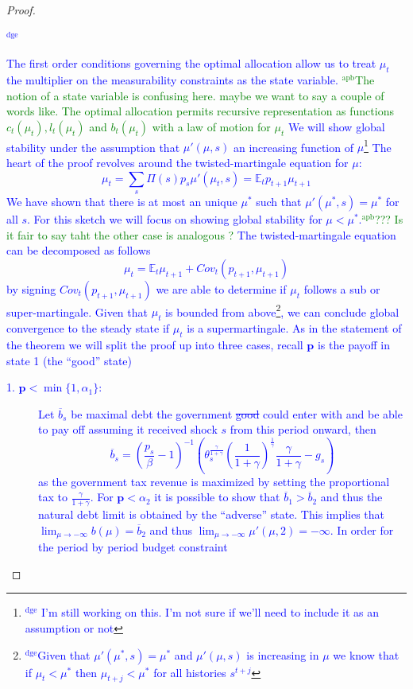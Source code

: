 \documentclass[12pt]{article}
\newcommand{\dge}[1]{\textcolor{blue}{$^{\textrm{dge}}${#1}}}
\newcommand{\apb}[1]{\textcolor{green}{$^{\textrm{apb}}${#1}}}
\newcommand{\EE}{\mathbb E}
\begin{document}
\begin{proof}\dge{The first order conditions governing the optimal allocation allow us to treat $\mu_t$ the multiplier on the measurability constraints as the state variable. 
\apb{The notion of a state variable is confusing here. maybe we want to say a couple of words like. The optimal allocation permits recursive representation as functions $c_t(\mu_t),l_t(\mu_t)$ and $b_t(\mu_t)$ with a law of motion for $\mu_{t}$}
We will show global stability under the assumption that $\mu'(\mu,s)$ an increasing function of $\mu$\footnote{\dge{ I'm still working on this.  I'm not sure if we'll need to include it as an assumption or not}}  The heart of the proof revolves around the twisted-martingale equation for $\mu$:
\[
	\mu_t = \sum_s \Pi(s) p_s \mu'(\mu_t,s) = \EE_t p_{t+1}\mu_{t+1}
\]  We have shown that there is at most an unique $\mu^*$ such that $\mu'(\mu^*,s) = \mu^*$ for all $s$.  For this sketch we will focus on showing global stability for $\mu < \mu^*$.\apb{??? Is it fair to say taht the other case is analogous ?}  The twisted-martingale equation can be decomposed as follows
\[ 
	\mu_t = \EE_t \mu_{t+1}+Cov_t(p_{t+1},\mu_{t+1})
\] by signing $Cov_t(p_{t+1},\mu_{t+1})$ we are able to determine if $\mu_t$ follows a sub or super-martingale.  Given that $\mu_t$ is bounded from above\footnote{\dge{Given that $\mu'(\mu^*,s) = \mu^*$ and $\mu'(\mu,s)$ is increasing in $\mu$  we know that if $\mu_t < \mu^*$ then $\mu_{t+j} < \mu^*$ for all histories $s^{t+j}$}}, we can conclude global convergence to the steady state if $\mu_t$ is a supermartingale.  As in the statement of the theorem we will split the proof up into three cases, recall $\bm p$ is the payoff in state 1 (the ``good'' state)
\begin{description}
	\item[1. $\bm p < \min\{1,\alpha_1\}$:]  Let $\overline b_s$ be maximal debt the government \st{good} could enter with and be able to pay off assuming it received shock $s$ from this period onward, then
	\[
	\overline b_s = \left(\frac{p_s}{\beta}-1\right)^{-1}\left(\theta_s^\frac{\gamma}{1+\gamma}\left(\frac1{1+\gamma}\right)^\frac1\gamma\frac\gamma{1+\gamma}-g_s\right)
	\]as the government tax revenue is maximized by setting the proportional tax to $\frac\gamma{1+\gamma}$.  For $\bm p <\alpha_2$ it is possible to show that $\overline b_1 > \overline b_2$ and thus the natural debt limit is obtained by the ``adverse'' state.  This implies that $\lim_{\mu\rightarrow-\infty} b(\mu) = \overline b_2$ and thus $\lim_{\mu\rightarrow-\infty} \mu'(\mu,2) = -\infty$.  In order for the period by period budget constraint

\end{description}}
\end{proof}
\end{document}
